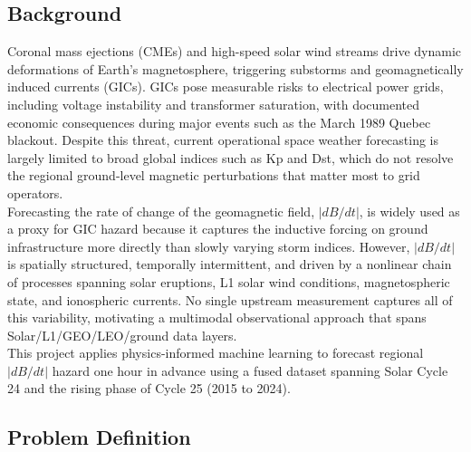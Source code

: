 \documentclass{article}
\begin{document}
\subsection*{Background}
Coronal mass ejections (CMEs) and high-speed solar wind streams drive dynamic deformations of Earth's magnetosphere, triggering substorms and geomagnetically induced currents (GICs). GICs pose measurable risks to electrical power grids, including voltage instability and transformer saturation, with documented economic consequences during major events such as the March 1989 Quebec blackout. Despite this threat, current operational space weather forecasting is largely limited to broad global indices such as Kp and Dst, which do not resolve the regional ground-level magnetic perturbations that matter most to grid operators.\\

\noindent Forecasting the rate of change of the geomagnetic field, $|dB/dt|$, is widely used as a proxy for GIC hazard because it captures the inductive forcing on ground infrastructure more directly than slowly varying storm indices. However, $|dB/dt|$ is spatially structured, temporally intermittent, and driven by a nonlinear chain of processes spanning solar eruptions, L1 solar wind conditions, magnetospheric state, and ionospheric currents. No single upstream measurement captures all of this variability, motivating a multimodal observational approach that spans Solar/L1/GEO/LEO/ground data layers.\\

\noindent This project applies physics-informed machine learning to forecast regional $|dB/dt|$ hazard one hour in advance using a fused dataset spanning Solar Cycle 24 and the rising phase of Cycle 25 (2015 to 2024).

\subsection*{Problem Definition}
\end{document}
